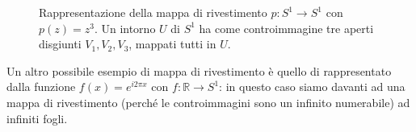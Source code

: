 \begin{figure}[htbp]
    \caption{Rappresentazione della mappa di rivestimento $p: S^1 \to S^1$ con $p(z)=z^3$. Un intorno $U$ di $S^1$ ha come controimmagine tre aperti disgiunti $V_1, V_2, V_3$, mappati tutti in $U$.}
\end{figure}

Un altro possibile esempio di mappa di rivestimento è quello di rappresentato dalla funzione $f(x) = e^{i 2 \pi x}$ con $f: \mathbb{R} \to S^1$: in questo caso siamo davanti ad una mappa di rivestimento (perché le controimmagini sono un infinito numerabile) ad infiniti fogli.

